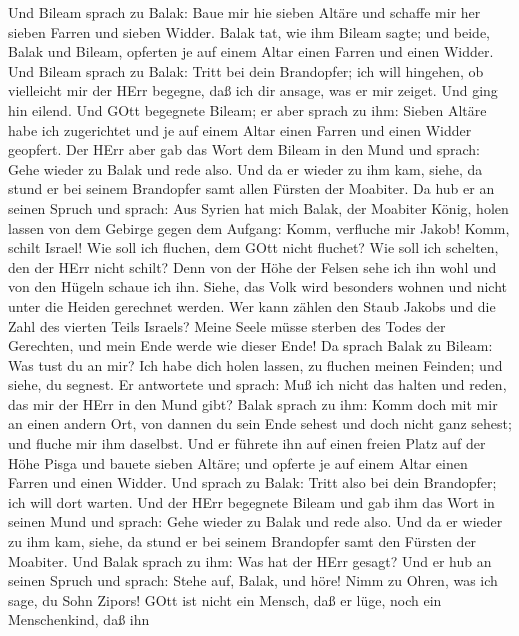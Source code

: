  Und Bileam sprach zu Balak: Baue mir hie sieben Altäre und
schaffe mir her sieben Farren und sieben Widder.  Balak tat,
wie ihm Bileam sagte; und beide, Balak und Bileam, opferten je auf einem
Altar einen Farren und einen Widder.  Und Bileam sprach zu
Balak: Tritt bei dein Brandopfer; ich will hingehen, ob vielleicht mir
der HErr begegne, daß ich dir ansage, was er mir zeiget. Und ging hin
eilend.  Und GOtt begegnete Bileam; er aber sprach zu ihm:
Sieben Altäre habe ich zugerichtet und je auf einem Altar einen Farren
und einen Widder geopfert.  Der HErr aber gab das Wort dem
Bileam in den Mund und sprach: Gehe wieder zu Balak und rede also.
 Und da er wieder zu ihm kam, siehe, da stund er bei seinem
Brandopfer samt allen Fürsten der Moabiter.  Da hub er an
seinen Spruch und sprach: Aus Syrien hat mich Balak, der Moabiter König,
holen lassen von dem Gebirge gegen dem Aufgang: Komm, verfluche mir
Jakob! Komm, schilt Israel!  Wie soll ich fluchen, dem GOtt
nicht fluchet? Wie soll ich schelten, den der HErr nicht schilt?
 Denn von der Höhe der Felsen sehe ich ihn wohl und von den
Hügeln schaue ich ihn. Siehe, das Volk wird besonders wohnen und nicht
unter die Heiden gerechnet werden.  Wer kann zählen den
Staub Jakobs und die Zahl des vierten Teils Israels? Meine Seele müsse
sterben des Todes der Gerechten, und mein Ende werde wie dieser Ende!
 Da sprach Balak zu Bileam: Was tust du an mir? Ich habe
dich holen lassen, zu fluchen meinen Feinden; und siehe, du segnest.
 Er antwortete und sprach: Muß ich nicht das halten und
reden, das mir der HErr in den Mund gibt?  Balak sprach zu
ihm: Komm doch mit mir an einen andern Ort, von dannen du sein Ende
sehest und doch nicht ganz sehest; und fluche mir ihm daselbst.
 Und er führete ihn auf einen freien Platz auf der Höhe
Pisga und bauete sieben Altäre; und opferte je auf einem Altar einen
Farren und einen Widder.  Und sprach zu Balak: Tritt also
bei dein Brandopfer; ich will dort warten.  Und der HErr
begegnete Bileam und gab ihm das Wort in seinen Mund und sprach: Gehe
wieder zu Balak und rede also.  Und da er wieder zu ihm
kam, siehe, da stund er bei seinem Brandopfer samt den Fürsten der
Moabiter. Und Balak sprach zu ihm: Was hat der HErr gesagt?
 Und er hub an seinen Spruch und sprach: Stehe auf, Balak,
und höre! Nimm zu Ohren, was ich sage, du Sohn Zipors! 
GOtt ist nicht ein Mensch, daß er lüge, noch ein Menschenkind, daß ihn
